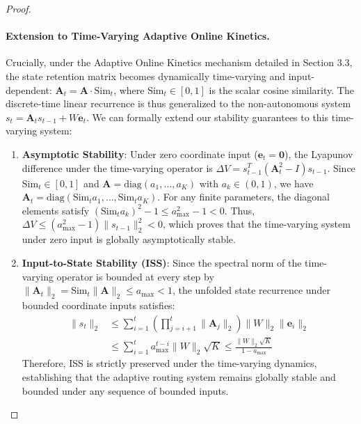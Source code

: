 \begin{proof}
\paragraph{Extension to Time-Varying Adaptive Online Kinetics.}
Crucially, under the \textsf{Adaptive Online Kinetics} mechanism detailed in Section 3.3, the state retention matrix becomes dynamically time-varying and input-dependent: $\mathbf{A}_t = \mathbf{A} \cdot \text{Sim}_t$, where $\text{Sim}_t \in [0, 1]$ is the scalar cosine similarity. The discrete-time linear recurrence is thus generalized to the non-autonomous system $s_t = \mathbf{A}_t s_{t-1} + W \mathbf{e}_t$. We can formally extend our stability guarantees to this time-varying system:
\begin{enumerate}
    \item \textbf{Asymptotic Stability}: Under zero coordinate input ($\mathbf{e}_t = \mathbf{0}$), the Lyapunov difference under the time-varying operator is $\Delta V = s_{t-1}^T (\mathbf{A}_t^2 - I) s_{t-1}$. Since $\text{Sim}_t \in [0, 1]$ and $\mathbf{A} = \text{diag}(a_1, \dots, a_K)$ with $a_k \in (0, 1)$, we have $\mathbf{A}_t = \text{diag}(\text{Sim}_t a_1, \dots, \text{Sim}_t a_K)$. For any finite parameters, the diagonal elements satisfy $(\text{Sim}_t a_k)^2 - 1 \le a_{\max}^2 - 1 < 0$. Thus, $\Delta V \le (a_{\max}^2 - 1) \|s_{t-1}\|_2^2 < 0$, which proves that the time-varying system under zero input is globally asymptotically stable.
    \item \textbf{Input-to-State Stability (ISS)}: Since the spectral norm of the time-varying operator is bounded at every step by $\|\mathbf{A}_t\|_2 = \text{Sim}_t \|\mathbf{A}\|_2 \le a_{\max} < 1$, the unfolded state recurrence under bounded coordinate inputs satisfies:
    \begin{equation}
    \begin{aligned}
        \|s_t\|_2 &\le \sum_{i=1}^t \left( \prod_{j=i+1}^t \|\mathbf{A}_j\|_2 \right) \|W\|_2 \|\mathbf{e}_i\|_2 \\
        &\le \sum_{i=1}^t a_{\max}^{t-i} \|W\|_2 \sqrt{K} \le \frac{\|W\|_2 \sqrt{K}}{1 - a_{\max}}
    \end{aligned}
    \end{equation}
    Therefore, ISS is strictly preserved under the time-varying dynamics, establishing that the adaptive routing system remains globally stable and bounded under any sequence of bounded inputs.
\end{enumerate}
\end{proof}
